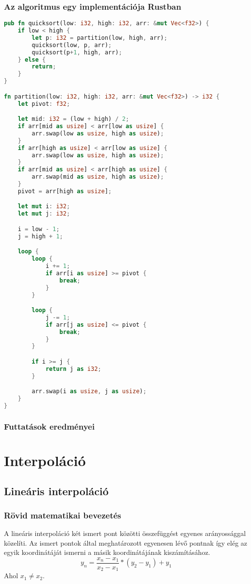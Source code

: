 \subsubsection{Az algoritmus egy implementációja Rustban}
\begin{lstlisting}[language=Rust]
pub fn quicksort(low: i32, high: i32, arr: &mut Vec<f32>) {
	if low < high {
		let p: i32 = partition(low, high, arr);
		quicksort(low, p, arr);
		quicksort(p+1, high, arr);
	} else {
		return;
	}
}

fn partition(low: i32, high: i32, arr: &mut Vec<f32>) -> i32 {
	let pivot: f32;

	let mid: i32 = (low + high) / 2;
	if arr[mid as usize] < arr[low as usize] {
		arr.swap(low as usize, high as usize);
	}
	if arr[high as usize] < arr[low as usize] {
		arr.swap(low as usize, high as usize);
	}
	if arr[mid as usize] < arr[high as usize] {
		arr.swap(mid as usize, high as usize);
	}
	pivot = arr[high as usize];

	let mut i: i32;
	let mut j: i32;

	i = low - 1;
	j = high + 1;

	loop {
		loop {
			i += 1;
			if arr[i as usize] >= pivot {
				break;
			}
		}

		loop {
			j -= 1;
			if arr[j as usize] <= pivot {
				break;
			}
		}

		if i >= j {
			return j as i32;
		}

		arr.swap(i as usize, j as usize);
	}
}
\end{lstlisting}
\subsubsection{Futtatások eredményei} %

\section{Interpoláció}

\subsection{Lineáris interpoláció}
\subsubsection{Rövid matematikai bevezetés}
A lineáris interpoláció két ismert pont közötti összefüggést egyenes arányossággal közelíti. Az ismert pontok által meghatározott egyenesen lévő pontnak így elég az egyik koordinátáját ismerni a másik koordinátájának kiszámításához.
\[ y_n = \frac{x_n - x_1}{x_2 - x_1} * (y_2 - y_1) + y_1 \]
Ahol $x_1 \neq x_2$.
